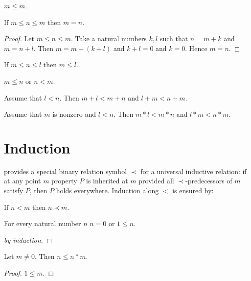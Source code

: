 \documentclass[11pt]{article}
\begin{document}
\begin{forthel}

\begin{lemma}
$m \leq m$.
\end{lemma}

\begin{lemma}
If $m \leq n \leq m$ then $m = n$.
\end{lemma}
\begin{proof}
Let $m \leq n \leq m$.
Take a natural numbers $k,l$ such that
$n = m + k$ and $m = n + l$.
Then $m = m + (k + l)$ and $k + l = 0$ and $k = 0$.
Hence $m = n$.
\end{proof}

\begin{lemma}
If $m \leq n \leq l$ then  $m \leq l$.
\end{lemma}

\begin{axiom}
$m \leq n$ or $n < m$.
\end{axiom}

\begin{lemma}
Assume that $l < n$.
Then $m + l < m + n$ and $l + m < n + m$.
\end{lemma}

\begin{lemma}
Assume that $m$ is nonzero and $l < n$.
Then $m * l < m * n$ and $l * m < n * m$.
\end{lemma}

\end{forthel}


\section{Induction}

\Naproche provides a special binary relation
symbol $\prec$ for a universal inductive relation: if at any
point $m$ property $P$ is inherited at $m$ provided all
$\prec$-predecessors of $m$ satisfy $P$, then $P$ holds everywhere.
Induction along $<$ is ensured by:

\begin{forthel}

\begin{axiom}
If $n < m$ then $n \prec m$.
\end{axiom}

\begin{lemma}
For every natural number $n$ $n = 0$ or $1 \leq n$.
\end{lemma}
\begin{proof}[by induction]
\end{proof}

\begin{lemma}
Let $m \neq 0$. Then $n \leq n * m$.
\end{lemma}
\begin{proof}
$1 \leq m$.
\end{proof}

\end{forthel}
\end{document}
